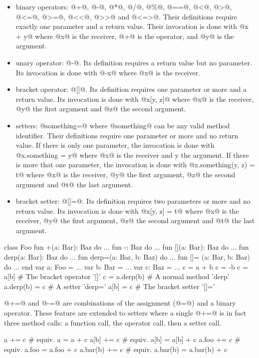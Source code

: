 \begin{itemize}
\item binary operators: @+@, @-@, @*@, @/@, @\%@, @==@, @<@, @>@, @<=@, @>=@, @<<@, @>>@ and @<=>@.
Their definitions require exactly one parameter and a return value.
Their invocation is done with @x + y@ where @x@ is the receiver, @+@ is the operator, and @y@ is the argument.
\item unary operator: @-@.
Its definition requires a return value but no parameter.
Its invocation is done with @-x@ where @x@ is the receiver.
\item bracket operator: @[]@.
Its definition requires one parameter or more and a return value.
Its invocation is done with @x[y, z]@ where @x@ is the receiver, @y@ the first argument and @z@ the second argument.
\item setters: @something=@ where @something@ can be any valid method identifier.
Their definitions require one parameter or more and no return value.
If there is only one parameter, the invocation is done with @x.something = y@ where @x@ is the receiver and y the argument.
If there is more that one parameter, the invocation is done with @x.something(y, z) = t@ where @x@ is the receiver, @y@ the first argument, @z@ the second argument and @t@ the last argument.
\item bracket setter: @[]=@.
Its definition requires two parameters or more and no return value.
Its invocation is done with @x[y, z] = t@ where @x@ is the receiver, @y@ the first argument, @z@ the second argument and @t@ the last argument.
\end{itemize}

\begin{lst}
class Foo
	fun +(a: Bar): Baz do ...
	fun -: Baz do ...
	fun [](a: Bar): Baz do ...
	fun derp(a: Bar): Baz do ...
	fun derp=(a: Bar, b: Baz) do ...
	fun []= (a: Bar, b: Baz) do ...
end
var a: Foo = ...
var b: Bar = ...
var c: Baz = ...
c = a + b
c = -b
c = a[b] # The bracket operator '[]'
c = a.derp(b) # A normal method 'derp'
a.derp(b) = c # A setter 'derp='
a[b] = c # The bracket setter '[]='
\end{lst}

@+=@ and @-=@ are combinations of the assignment (@=@) and a binary operator.
These feature are extended to setters where a single @+=@ is in fact three method calls: a function call, the operator call, then a setter call.
\begin{lst}
a += c # equiv. a = a + c
a[b] += c # equiv. a[b] = a[b] + c
a.foo += c # equiv. a.foo = a.foo + c
a.bar(b) += c # equiv. a.bar(b) = a.bar(b) + c
\end{lst} 

